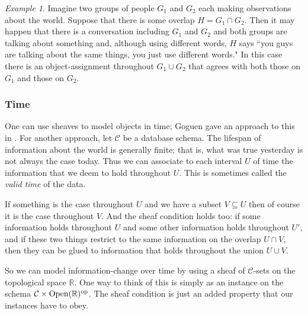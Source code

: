 \documentclass{book}
\def\tn{\textnormal}
\def\mc{\mathcal}
\def\RR{{\mathbb R}}
\def\Op{\tn{Open}}
\def\ss{\subseteq}
\def\op{^\tn{op}}
\def\mcC{\mc{C}}
\theoremstyle{remark}
\newtheorem{example}[subsubsection]{Example}
\theoremstyle{definition}
\begin{document}
\begin{example}

Imagine two groups of people $G_1$ and $G_2$ each making observations about the world. Suppose that there is some overlap $H=G_1\cap G_2$. Then it may happen that there is a conversation including $G_1$ and $G_2$ and both groups are talking about something and, although using different words, $H$ says ``you guys are talking about the same things, you just use different words." In this case there is an object-assignment throughout $G_1\cup G_2$ that agrees with both those on $G_1$ and those on $G_2$.

\end{example}


\subsubsection{Time}

One can use sheaves to model objects in time; Goguen gave an approach to this in \cite{Gog}. For another approach, let $\mcC$ be a database schema. The lifespan of information about the world is generally finite; that is, what was true yesterday is not always the case today. Thus we can associate to each interval $U$ of time the information that we deem to hold throughout $U$. This is sometimes called the {\em valid time} of the data.

If something is the case throughout $U$ and we have a subset $V\ss U$ then of course it is the case throughout $V$. And the sheaf condition holds too: if some information holds throughout $U$ and some other information holds throughout $U'$, and if these two things restrict to the same information on the overlap $U\cap V$, then they can be glued to information that holds throughout the union $U\cup V$.

So we can model information-change over time by using a sheaf of $\mcC$-sets on the topological space $\RR$. One way to think of this is simply as an instance on the schema $\mcC\times\Op(\RR)\op$. The sheaf condition is just an added property that our instances have to obey.
\end{document}
